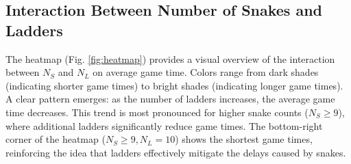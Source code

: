 \documentclass[12pt]{report}
\begin{document}
%	
%	
%	
%	
	\subsection{Interaction Between Number of Snakes and Ladders}
	
	The heatmap (Fig. \ref{fig:heatmap}) provides a visual overview of the interaction between $N_S$ and $N_L$ on average game time. Colors range from dark shades (indicating shorter game times) to bright shades (indicating longer game times). A clear pattern emerges: as the number of ladders increases, the average game time decreases. This trend is most pronounced for higher snake counts ($N_S \geq 9$), where additional ladders significantly reduce game times. The bottom-right corner of the heatmap ($N_S \geq 9, N_L = 10$) shows the shortest game times, reinforcing the idea that ladders effectively mitigate the delays caused by snakes.
	
\end{document}
